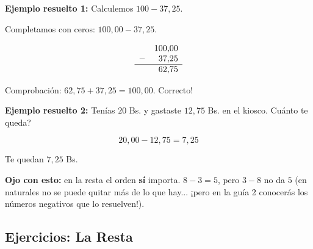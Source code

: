 \documentclass[12pt, letterpaper]{article}
\begin{document}
\noindent\textbf{Ejemplo resuelto 1:} Calculemos $100 - 37{,}25$.

Completamos con ceros: $100{,}00 - 37{,}25$.

\[
  \begin{array}{rr}
      & 100{,}00 \\
    - & 37{,}25  \\ \hline
      & 62{,}75
  \end{array}
\]

\noindent Comprobación: $62{,}75 + 37{,}25 = 100{,}00$. \textquestiondown Correcto!

\noindent\textbf{Ejemplo resuelto 2:} Tenías $20$ Bs. y gastaste $12{,}75$ Bs. en el kiosco. \textquestiondown Cuánto te queda?

\[
  20{,}00 - 12{,}75 = 7{,}25
\]

\noindent Te quedan $7{,}25$ Bs.

\begin{cuadroadvertencia}
  \textbf{Ojo con esto:} en la resta el orden \textbf{sí} importa. $8 - 3 = 5$, pero $3 - 8$ no da $5$ (en naturales no se puede quitar más de lo que hay... ¡pero en la guía 2 conocerás los números negativos que lo resuelven!).
\end{cuadroadvertencia}

\subsection{Ejercicios: La Resta}
\end{document}

